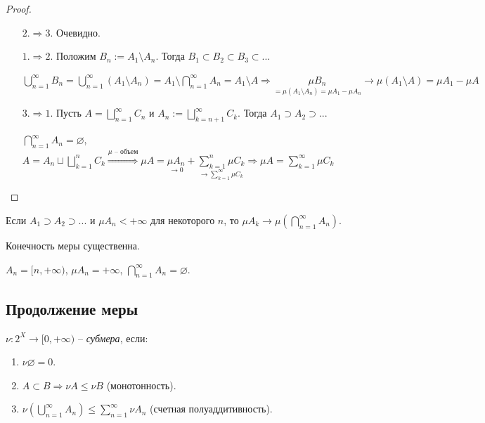 \begin{proof}~
    \begin{enumerate}
        \item[$2. \Rightarrow 3.$] Очевидно.
        \item[$1. \Rightarrow 2.$] Положим $B_n := A_1 \setminus A_n$. Тогда $B_1 \subset B_2 \subset B_3 \subset ...$
        
        $\bigcup\limits_{n=1}^\infty B_n = \bigcup\limits_{n=1}^\infty (A_1 \setminus A_n) = A_1 \setminus \bigcap\limits_{n=1}^\infty A_n = A_1 \setminus A\Rightarrow
        \underset{=\mu(A_1\setminus A_n)=\mu A_1 - \mu A_n}{\mu B_n} \rightarrow \mu (A_1\setminus A) = \mu A_1-\mu A$

        \item[$3. \Rightarrow 1.$] Пусть $A=\bigsqcup\limits_{n=1}^\infty C_n$ и $A_n:=\bigsqcup\limits_{k=n+1}^\infty C_k$. Тогда $A_1 \supset A_2 \supset ...$ 
        
        $\bigcap\limits_{n=1}^\infty A_n =\varnothing$, $A=A_n \sqcup \bigsqcup\limits_{k=1}^n C_k\overset{\mu\text{ – объем}}{\Rightarrow}
        \mu A = \underset{\rightarrow 0}{\mu A_n}+\underset{\rightarrow\sum\limits_{k=1}^\infty \mu C_k}{\sum\limits_{k=1}^n \mu C_k}\Rightarrow
        \mu A = \sum\limits_{k=1}^\infty \mu C_k$
    \end{enumerate}
\end{proof}

\begin{corollary}
    Если $A_1 \supset A_2 \supset ...$ и $\mu A_n < +\infty$ для некоторого
    $n$, то $\mu A_k \rightarrow \mu (\bigcap\limits_{n=1}^\infty A_n)$.
\end{corollary}

\begin{remark}
    Конечность меры существенна.

    $A_n = [n, +\infty)$, $\mu A_n = +\infty$, $\bigcap\limits_{n=1}^\infty A_n =\varnothing$.
\end{remark}

\subsection{Продолжение меры}

\begin{definition}
    $\nu: 2^X \rightarrow [0, +\infty)$ – \textit{субмера}, если:
    \begin{enumerate}
        \item $\nu \varnothing =0$.
        \item $A\subset B\Rightarrow \nu A\leq \nu B$ (монотонность).
        \item $\nu(\bigcup\limits_{n=1}^\infty A_n)\leq \sum\limits_{n=1}^\infty \nu A_n$ (счетная полуаддитивность).
    \end{enumerate}
\end{definition}

